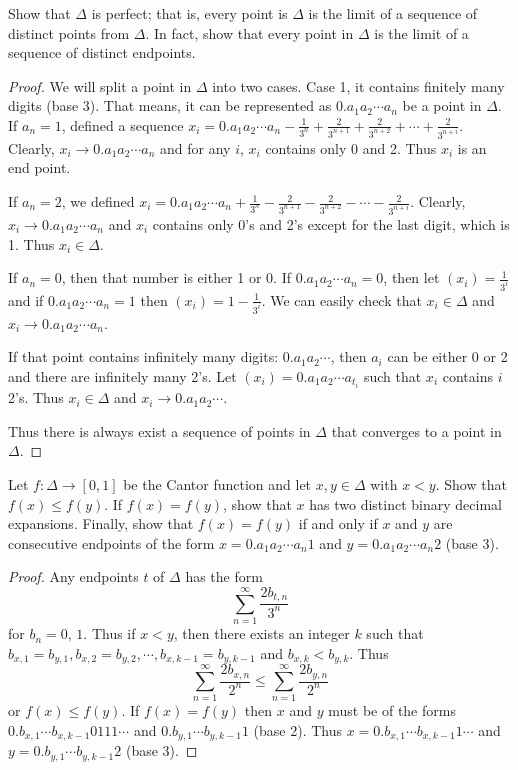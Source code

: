 \documentclass[12pt, a4paper]{article}
\theoremstyle{plain}
\begin{document}
\begin{exercise}{24}
Show that $\Delta$ is perfect; that is, every point is $\Delta$ is the limit of a sequence of distinct points from $\Delta$. In fact, show that every point in $\Delta$ is the limit of a sequence of distinct endpoints.
\end{exercise}
	\begin{proof}
	We will split a point in $\Delta$ into two cases. Case 1, it contains finitely many digits (base 3). That means, it can be represented as $0.a_1a_2\cdots a_n$ be a point in $\Delta$. If $a_n=1$, defined a sequence $x_i=0.a_1a_2\cdots a_n-\frac{1}{3^n}+\frac{2}{3^{n+1}}+\frac{2}{3^{n+2}}+\cdots +\frac{2}{3^{n+i}}$. Clearly, $x_i\rightarrow 0.a_1a_2\cdots a_n$ and for any $i$, $x_i$ contains only 0 and 2. Thus $x_i$ is an end point.
	
	If $a_n=2$, we defined $x_i=0.a_1a_2\cdots a_n+\frac{1}{3^n} -\frac{2}{3^{n+1}} -\frac{2}{3^{n+2}} -\cdots -\frac{2}{3^{n+i}}$. Clearly, $x_i\rightarrow 0.a_1a_2\cdots a_n$ and $x_i$ contains only 0's and 2's except for the last digit, which is 1. Thus $x_i\in \Delta$.
	
	If $a_n=0$, then that number is either 1 or 0. If $0.a_1a_2\cdots a_n=0$, then let $(x_i)=\frac{1}{3^i}$ and if $0.a_1a_2\cdots a_n=1$ then $(x_i)=1-\frac{1}{3^i}$. We can easily check that $x_i\in \Delta$ and $x_i\rightarrow 0.a_1a_2\cdots a_n$.
	
	If that point contains infinitely many digits: $0.a_1a_2\cdots$, then $a_i$ can be either 0 or 2 and there are infinitely many 2's. Let $(x_i)=0.a_1a_2\cdots a_{t_i}$ such that $x_i$ contains $i$ 2's. Thus $x_i\in \Delta$ and $x_i \rightarrow 0.a_1a_2\cdots$.
	
	Thus there is always exist a sequence of points in $\Delta$ that converges to a point in $\Delta$.
	\end{proof}
	
\pagebreak

\begin{exercise}{26}
Let $f:\Delta\rightarrow [0,1]$ be the Cantor function and let $x,y\in \Delta$ with $x<y$. Show that $f(x)\leq f(y)$. If $f(x)=f(y)$, show that $x$ has two distinct binary decimal expansions. Finally, show that $f(x)=f(y)$ if and only if $x$ and $y$ are consecutive endpoints of the form $x=0.a_1a_2\cdots a_n1$ and $y=0.a_1a_2\cdots a_n2$ (base 3).
\end{exercise}
	\begin{proof}
	Any endpoints $t$ of $\Delta$ has the form 
	\[\sum_{n=1}^{\infty}{\frac{2b_{t,n}}{3^n}}
	\]
	for $b_n=0,\,1$. Thus if $x<y$, then there exists an integer $k$ such that $b_{x,1}=b_{y,1},b_{x,2}=b_{y,2},\cdots ,b_{x,k-1}=b_{y,k-1}$ and $b_{x,k}<b_{y,k}$. Thus \[
	\sum_{n=1}^{\infty}{\frac{2b_{x,n}}{2^n}}\leq\sum_{n=1}^{\infty}{\frac{2b_{y,n}}{2^n}}
	\]
	or $f(x)\leq f(y)$. If $f(x)=f(y)$ then $x$ and $y$ must be of the forms $0.b_{x,1}\cdots b_{x,k-1}0111\cdots$ and $0.b_{y,1}\cdots b_{y,k-1}1$ (base 2). Thus $x=0.b_{x,1}\cdots b_{x,k-1}1\cdots$ and $y=0.b_{y,1}\cdots b_{y,k-1}2$ (base 3).
	\end{proof}
\end{document}
